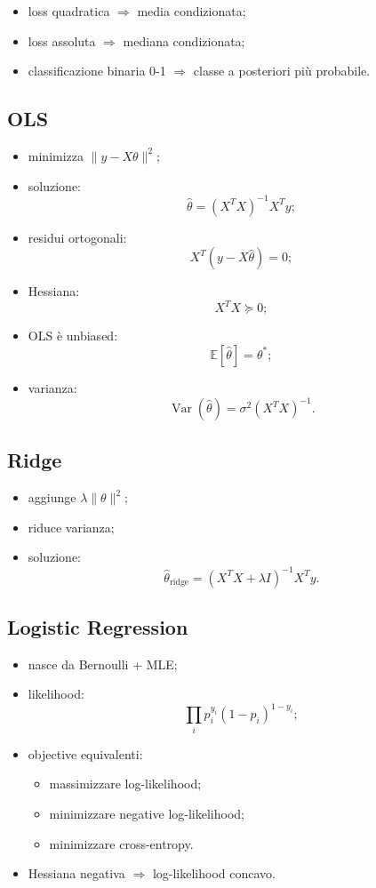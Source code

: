 \documentclass[
]{article}
\providecommand{\tightlist}{%
  \setlength{\itemsep}{0pt}\setlength{\parskip}{0pt}}
\begin{document}
\begin{itemize}
\tightlist
\item
  loss quadratica \(\Rightarrow\) media condizionata;
\item
  loss assoluta \(\Rightarrow\) mediana condizionata;
\item
  classificazione binaria 0-1 \(\Rightarrow\) classe a posteriori più
  probabile.
\end{itemize}

\subsection{OLS}\label{ols}

\begin{itemize}
\tightlist
\item
  minimizza \(\|y-X\theta\|^2\);
\item
  soluzione: \[
  \hat\theta=(X^TX)^{-1}X^Ty;
  \]
\item
  residui ortogonali: \[
  X^T(y-X\hat\theta)=0;
  \]
\item
  Hessiana: \[
  X^TX \succeq 0;
  \]
\item
  OLS è unbiased: \[
  \mathbb{E}[\hat\theta]=\theta^*;
  \]
\item
  varianza: \[
  \operatorname{Var}(\hat\theta)=\sigma^2(X^TX)^{-1}.
  \]
\end{itemize}

\subsection{Ridge}\label{ridge}

\begin{itemize}
\tightlist
\item
  aggiunge \(\lambda\|\theta\|^2\);
\item
  riduce varianza;
\item
  soluzione: \[
  \hat\theta_{\text{ridge}}=(X^TX+\lambda I)^{-1}X^Ty.
  \]
\end{itemize}

\subsection{Logistic Regression}\label{logistic-regression}

\begin{itemize}
\tightlist
\item
  nasce da Bernoulli + MLE;
\item
  likelihood: \[
  \prod_i p_i^{y_i}(1-p_i)^{1-y_i};
  \]
\item
  objective equivalenti:

  \begin{itemize}
  \tightlist
  \item
    massimizzare log-likelihood;
  \item
    minimizzare negative log-likelihood;
  \item
    minimizzare cross-entropy.
  \end{itemize}
\item
  Hessiana negativa \(\Rightarrow\) log-likelihood concavo.
\end{itemize}
\end{document}
